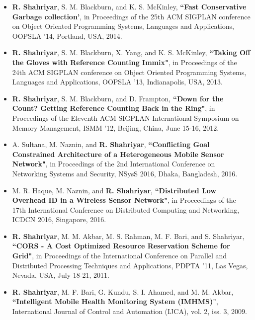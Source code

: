 \documentclass[letterpaper,11pt]{article}
\begin{document}
\begin{itemize}

\item {\bf R. Shahriyar}, S. M. Blackburn, and K. S. McKinley,  {\color{black} \bf
    ``Fast Conservative Garbage collection'}, in Proceedings of the 25th ACM SIGPLAN conference on Object Oriented Programming Systems, Languages and Applications, OOPSLA '14, Portland, USA, 2014.

\item {\bf R. Shahriyar}, S. M. Blackburn, X. Yang, and K. S. McKinley, {\color{black} \bf
    ``Taking Off the Gloves with Reference Counting Immix"},  in Proceedings of the 24th ACM SIGPLAN conference on Object Oriented Programming Systems, Languages and Applications, OOPSLA '13, Indianapolis, USA, 2013.

\item {\bf R. Shahriyar}, S. M. Blackburn, and D. Frampton,  {\color{black} \bf
    ``Down for the Count? Getting Reference Counting Back in the Ring"}, in Proceedings of the Eleventh ACM SIGPLAN International Symposium on Memory Management, ISMM '12, Beijing, China, June 15-16, 2012.

\item A. Sultana, M. Naznin, and {\bf R. Shahriyar}, {\color{black} \bf
    ``Conflicting Goal Constrained Architecture of a Heterogeneous Mobile Sensor Network"}, in Proceedings of the 2nd International Conference on Networking Systems and Security, NSysS 2016, Dhaka, Bangladesh, 2016.

\item M. R. Haque, M. Naznin, and {\bf R. Shahriyar}, {\color{black} \bf
    ``Distributed Low Overhead ID in a Wireless Sensor Network"}, in Proceedings of the 17th International Conference on Distributed Computing and Networking, ICDCN 2016, Singapore, 2016.

\item {\bf R. Shahriyar}, M. M. Akbar, M. S. Rahman, M. F. Bari, and S. Shahriyar, {\color{black} \bf
    ``CORS - A Cost Optimized Resource Reservation Scheme for Grid"}, in Proceedings of the International Conference on Parallel and Distributed Processing Techniques and Applications, PDPTA '11, Las Vegas, Nevada, USA, July 18-21, 2011. 

\item {\bf R. Shahriyar}, M. F. Bari, G. Kundu, S. I. Ahamed, and M. M. Akbar,  {\color{black} \bf
    ``Intelligent Mobile Health Monitoring System (IMHMS)"}, International Journal of Control and Automation (IJCA), vol. 2, iss. 3, 2009. 
    

\end{itemize}
\end{document}
